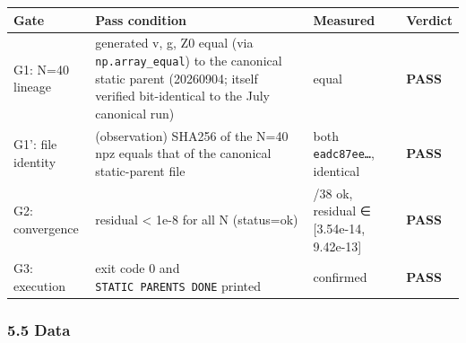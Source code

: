 \documentclass[
  a4paper,
]{ltjsarticle}
\newcounter{none} %
\begin{document}
{\def\LTcaptype{none} %
\begin{longtable}[]{@{}
  >{\raggedright\arraybackslash}p{}
  >{\raggedright\arraybackslash}p{}
  >{\raggedright\arraybackslash}p{}
  >{\raggedright\arraybackslash}p{}@{}}
\toprule\noalign{}
\begin{minipage}[b]{\linewidth}\raggedright
Gate
\end{minipage} & \begin{minipage}[b]{\linewidth}\raggedright
Pass condition
\end{minipage} & \begin{minipage}[b]{\linewidth}\raggedright
Measured
\end{minipage} & \begin{minipage}[b]{\linewidth}\raggedright
Verdict
\end{minipage} \\
\midrule\noalign{}
\endhead
\bottomrule\noalign{}
\endlastfoot
G1: N=40 lineage & generated v, g, Z0 equal (via
\texttt{np.array\_equal}) to the canonical static parent (20260904;
itself verified bit-identical to the July canonical run) & equal &
\textbf{PASS} \\
G1': file identity & (observation) SHA256 of the N=40 npz equals that of
the canonical static-parent file & both \texttt{eadc87ee…}, identical &
\textbf{PASS} \\
G2: convergence & residual \textless{} 1e-8 for all N (status=ok) &
38/38 ok, residual ∈ {[}3.54e-14, 9.42e-13{]} & \textbf{PASS} \\
G3: execution & exit code 0 and \texttt{STATIC\ PARENTS\ DONE} printed &
confirmed & \textbf{PASS} \\
\end{longtable}
}

\subsubsection{5.5 Data}\label{data}
\end{document}
